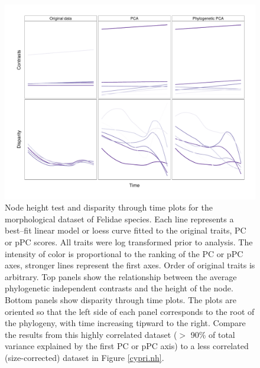 \documentclass[a4paper,11pt]{article}
\begin{document}
\begin{figure}[p]
\centering
\includegraphics[scale=0.65]{fig/felidae_nh-dtt.pdf}
\caption{Node height test and disparity through time plots for the morphological dataset of Felidae species. Each line represents a best--fit linear model or loess curve fitted to the original traits, PC or pPC scores. All traits were log transformed prior to analysis. The intensity of color is proportional to the ranking of the PC or pPC axes, stronger lines represent the first axes. Order of original traits is arbitrary. Top panels show the relationship between the average phylogenetic independent contrasts and the height of the node. Bottom panels show disparity through time plots. The plots are oriented so that the left side of each panel corresponds to the root of the phylogeny, with time increasing tipward to the right. Compare the results from this highly correlated dataset ($>$ 90\% of total variance explained by the first PC or pPC axis) to a less correlated (size-corrected) dataset in Figure \ref{cypri.nh}.}
\label{felidae.nh}
\end{figure}
\end{document}
